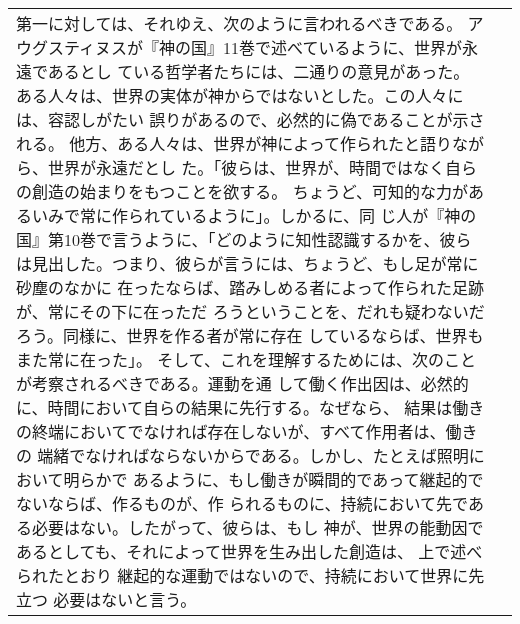 \documentclass[10pt]{jsarticle} %
\begin{document}
\begin{longtable}{p{21em}p{21em}}
第一に対しては、それゆえ、次のように言われるべきである。
アウグスティヌスが『神の国』11巻で述べているように、世界が永遠であるとし
 ている哲学者たちには、二通りの意見があった。
ある人々は、世界の実体が神からではないとした。この人々には、容認しがたい
 誤りがあるので、必然的に偽であることが示される。
他方、ある人々は、世界が神によって作られたと語りながら、世界が永遠だとし
 た。「彼らは、世界が、時間ではなく自らの創造の始まりをもつことを欲する。
 ちょうど、可知的な力があるいみで常に作られているように」。しかるに、同
 じ人が『神の国』第10巻で言うように、「どのように知性認識するかを、彼ら
 は見出した。つまり、彼らが言うには、ちょうど、もし足が常に砂塵のなかに
 在ったならば、踏みしめる者によって作られた足跡が、常にその下に在っただ
 ろうということを、だれも疑わないだろう。同様に、世界を作る者が常に存在
 しているならば、世界もまた常に在った」。
そして、これを理解するためには、次のことが考察されるべきである。運動を通
 して働く作出因は、必然的に、時間において自らの結果に先行する。なぜなら、
 結果は働きの終端においてでなければ存在しないが、すべて作用者は、働きの
 端緒でなければならないからである。しかし、たとえば照明において明らかで
 あるように、もし働きが瞬間的であって継起的でないならば、作るものが、作
 られるものに、持続において先である必要はない。したがって、彼らは、もし
 神が、世界の能動因であるとしても、それによって世界を生み出した創造は、
 上で述べられたとおり
継起的な運動ではないので、持続において世界に先立つ
 必要はないと言う。


\end{longtable}
\end{document}
